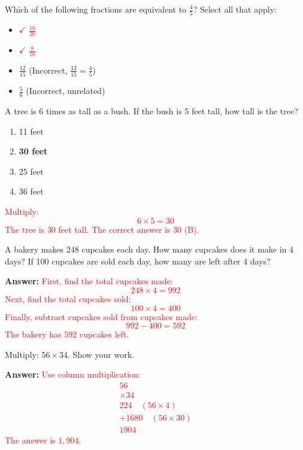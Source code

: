 \documentclass[12pt]{article}
\begin{document}
\begin{tcolorbox}[colframe=black!50, colback=white, title=\textbf{Problem 7 (4.NF.A.1)}]
Which of the following fractions are equivalent to \(\frac{4}{5}\)? Select all that apply:
\begin{itemize}[label=$\Box$]
    \item \textcolor{red}{\(\checkmark\) \(\frac{16}{20}\)}
    \item \textcolor{red}{\(\checkmark\) \(\frac{8}{10}\)}
    \item \(\frac{12}{15}\) (Incorrect, \(\frac{12}{15} = \frac{4}{5}\))
    \item \(\frac{5}{6}\) (Incorrect, unrelated)
\end{itemize}
\end{tcolorbox}

\begin{tcolorbox}[colframe=black!50, colback=white, title=\textbf{Problem 8 (4.OA.A.2)}]
A tree is 6 times as tall as a bush. If the bush is 5 feet tall, how tall is the tree?
\begin{enumerate}[label=(\Alph*)]
    \item 11 feet
    \item \textbf{30 feet}
    \item 25 feet
    \item 36 feet
\end{enumerate}

\textcolor{red}{Multiply:  
\[
6 \times 5 = 30
\]  
The tree is \(30\) feet tall. The correct answer is \(30\) (B).}
\end{tcolorbox}

\begin{tcolorbox}[colframe=black!50, colback=white, title=\textbf{Problem 9 (4.OA.A.3)}]
A bakery makes 248 cupcakes each day. How many cupcakes does it make in 4 days? If 100 cupcakes are sold each day, how many are left after 4 days?

\textbf{Answer:}  
\textcolor{red}{First, find the total cupcakes made:  
\[
248 \times 4 = 992
\]  
Next, find the total cupcakes sold:  
\[
100 \times 4 = 400
\]  
Finally, subtract cupcakes sold from cupcakes made:  
\[
992 - 400 = 592
\]  
The bakery has \(592\) cupcakes left.}
\end{tcolorbox}

\begin{tcolorbox}[colframe=black!50, colback=white, title=\textbf{Problem 10 (4.NBT.B.5)}]
Multiply: \(56 \times 34\). Show your work.

\textbf{Answer:}  
\textcolor{red}{Use column multiplication:  
\[
\begin{array}{r}
   56 \\
\times 34 \\
\hline
  224 \quad (\text{56} \times 4) \\
+1680 \quad (\text{56} \times 30) \\
\hline
 1904
\end{array}
\]  
The answer is \(1,904\).}
\end{tcolorbox}
\end{document}
